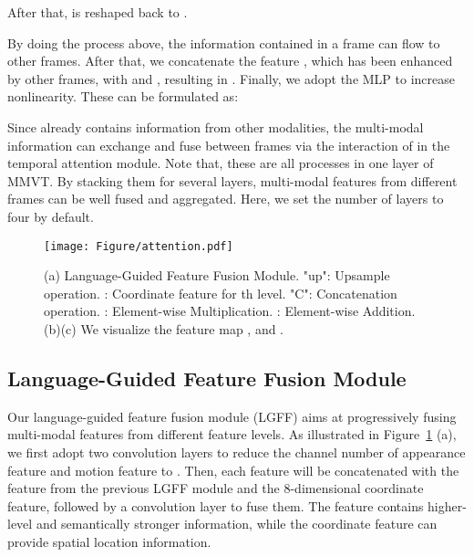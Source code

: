\documentclass[10pt,twocolumn,letterpaper]{article}
\begin{document}
\vspace{-2mm}

After that,  is reshaped back to . 

By doing the process above, the information contained in a frame can flow to other frames. After that, we concatenate the feature , which has been enhanced by other frames, with  and , resulting in . Finally, we adopt the MLP to increase nonlinearity. These can be formulated as:
\vspace{-2mm}

\vspace{-4mm}



Since  already contains information from other modalities, the multi-modal information can exchange and fuse between frames via the interaction of  in the temporal attention module. Note that, these are all processes in one layer of MMVT. By stacking them for several layers, multi-modal features from different frames can be well fused and aggregated. Here, we set the number of layers to four by default. 

\begin{figure}[!t]
    \centering
    \texttt{[image: Figure/attention.pdf]}
    \caption{(a) Language-Guided Feature Fusion Module. "up": Upsample operation. : Coordinate feature for th level. "C": Concatenation operation. : Element-wise Multiplication.  : Element-wise Addition. (b)(c) We visualize the feature map ,  and .}  \label{LGFF_figure}
    \vspace{-0.4cm}
\end{figure}


\subsection{Language-Guided Feature Fusion Module} \label{LGFF}
\vspace{-2mm}
Our language-guided feature fusion module (LGFF) aims at progressively fusing multi-modal features from different feature levels. As illustrated in Figure~\ref{LGFF_figure} (a), we first adopt two  convolution layers to reduce the channel number of appearance feature  and motion feature  to . Then, each feature will be concatenated with the feature from the previous LGFF module  and the 8-dimensional coordinate feature, followed by a  convolution layer to fuse them. The feature  contains higher-level and semantically stronger information, while the coordinate feature can provide spatial location information. 
\end{document}
